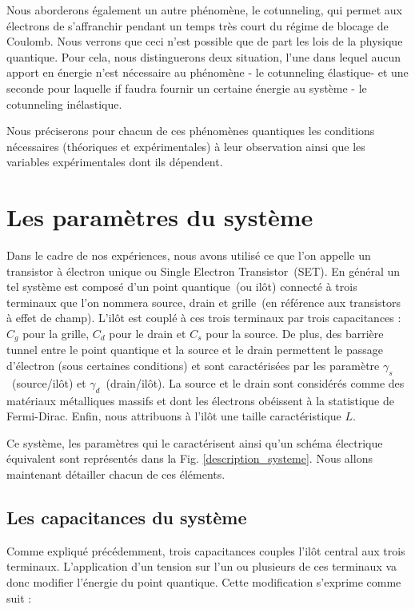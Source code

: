 Nous aborderons également un autre phénomène, le cotunneling, qui permet aux électrons de s'affranchir pendant un temps très court du régime de blocage de Coulomb. Nous verrons que ceci n'est possible que de part les lois de la physique quantique. Pour cela, nous distinguerons deux situation, l'une dans lequel aucun apport en énergie n'est nécessaire au phénomène - le cotunneling élastique- et une seconde pour laquelle if faudra fournir un certaine énergie au système - le cotunneling inélastique.

Nous préciserons pour chacun de ces phénomènes quantiques les conditions nécessaires (théoriques et expérimentales) à leur observation ainsi que les variables expérimentales dont ils dépendent.


\section{Les paramètres du système}
Dans le cadre de nos expériences, nous avons utilisé ce que l'on appelle un transistor à électron unique ou Single Electron Transistor~(SET). En général un tel système est composé d'un point quantique~(ou ilôt) connecté à trois terminaux que l'on nommera source, drain et grille~(en référence aux transistors à effet de champ). L'il\^ot est couplé à ces trois terminaux par trois capacitances : $C_g$ pour la grille, $C_d$ pour le drain et $C_s$ pour la source. De plus, des barrière tunnel entre le point quantique et la source et le drain permettent le passage d'électron (sous certaines conditions) et sont caractérisées par les paramètre $\gamma_s$~(source/il\^ot) et $\gamma_d$~(drain/il\^ot). La source et le drain sont considérés comme des matériaux métalliques massifs et dont les électrons obéissent à la statistique de Fermi-Dirac. Enfin, nous attribuons à l'il\^ot une taille caractéristique $L$. 

Ce système, les paramètres qui le caractérisent ainsi qu'un schéma électrique équivalent sont représentés dans la Fig. \ref{description_systeme}. Nous allons maintenant détailler chacun de ces éléments.


\subsection{Les capacitances du système}
Comme expliqué précédemment, trois capacitances couples l'il\^ot central aux trois terminaux. L'application d'un tension sur l'un ou plusieurs de ces terminaux va donc modifier l'énergie du point quantique. Cette modification s'exprime comme suit :

